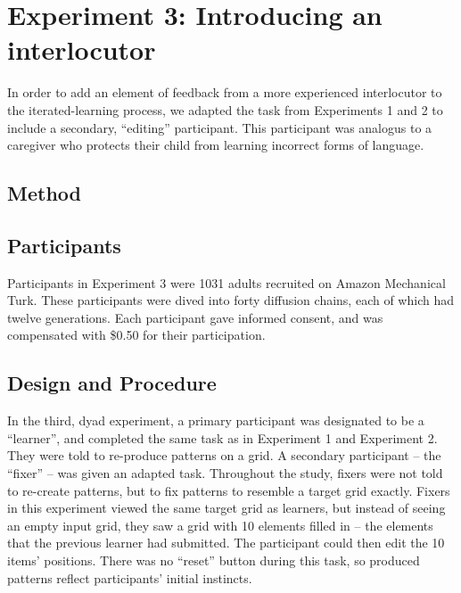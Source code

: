 \documentclass[10pt, letterpaper]{article}
\begin{document}
\hypertarget{experiment-3-introducing-an-interlocutor}{%
\section{Experiment 3: Introducing an
interlocutor}\label{experiment-3-introducing-an-interlocutor}}

In order to add an element of feedback from a more experienced
interlocutor to the iterated-learning process, we adapted the task from
Experiments 1 and 2 to include a secondary, ``editing'' participant.
This participant was analogus to a caregiver who protects their child
from learning incorrect forms of language.

\hypertarget{method-2}{%
\subsection{Method}\label{method-2}}

\hypertarget{participants-2}{%
\subsection{Participants}\label{participants-2}}

Participants in Experiment 3 were 1031 adults recruited on Amazon
Mechanical Turk. These participants were dived into forty diffusion
chains, each of which had twelve generations. Each participant gave
informed consent, and was compensated with \$0.50 for their
participation.

\hypertarget{design-and-procedure-2}{%
\subsection{Design and Procedure}\label{design-and-procedure-2}}

In the third, dyad experiment, a primary participant was designated to
be a ``learner'', and completed the same task as in Experiment 1 and
Experiment 2. They were told to re-produce patterns on a grid. A
secondary participant -- the ``fixer'' -- was given an adapted task.
Throughout the study, fixers were not told to re-create patterns, but to
fix patterns to resemble a target grid exactly. Fixers in this
experiment viewed the same target grid as learners, but instead of
seeing an empty input grid, they saw a grid with 10 elements filled in
-- the elements that the previous learner had submitted. The participant
could then edit the 10 items' positions. There was no ``reset'' button
during this task, so produced patterns reflect participants' initial
instincts.
\end{document}
